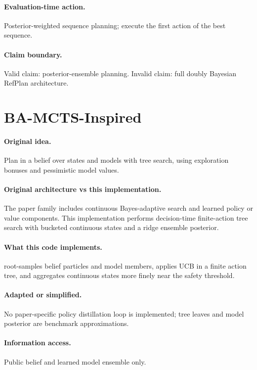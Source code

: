 \documentclass[11pt]{article}
\begin{document}
\paragraph{Evaluation-time action.}
Posterior-weighted sequence planning; execute the first action of the best
sequence.

\paragraph{Claim boundary.}
Valid claim: posterior-ensemble planning. Invalid claim: full doubly Bayesian
RefPlan architecture.

\section{BA-MCTS-Inspired}

\paragraph{Original idea.}
Plan in a belief over states and models with tree search, using exploration
bonuses and pessimistic model values.

\paragraph{Original architecture vs this implementation.}
The paper family includes continuous Bayes-adaptive search and learned policy or
value components. This implementation performs decision-time finite-action tree
search with bucketed continuous states and a ridge ensemble posterior.

\paragraph{What this code implements.}
 root-samples belief particles and model members, applies UCB in
a finite action tree, and aggregates continuous states more finely near the
safety threshold.

\paragraph{Adapted or simplified.}
No paper-specific policy distillation loop is implemented; tree leaves and model
posterior are benchmark approximations.

\paragraph{Information access.}
Public belief and learned model ensemble only.
\end{document}
